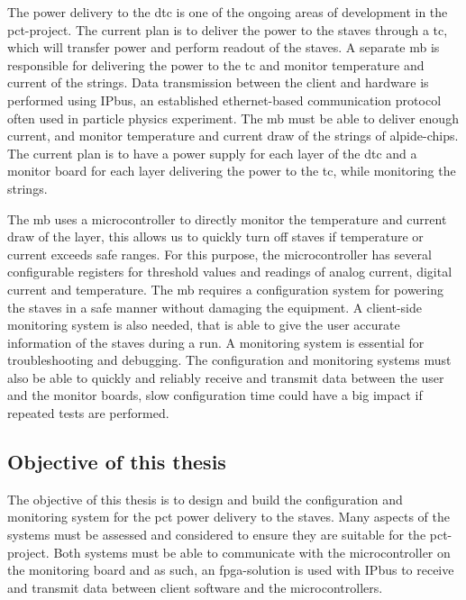 \documentclass[main.tex]{subfiles}
\begin{document}
The power delivery to the \gls{dtc} is one of the ongoing areas of development in the \gls{pct}-project. The current plan is to deliver the power to the staves through a \gls{tc}, which will transfer power and perform readout of the staves. A separate \gls{mb} is responsible for delivering the power to the \gls{tc} and monitor temperature and current of the strings. Data transmission between the client and hardware is performed using IPbus, an established ethernet-based communication protocol often used in particle physics experiment. The \gls{mb} must be able to deliver enough current, and monitor temperature and current draw of the strings of \gls{alpide}-chips. The current plan is to have a power supply for each layer of the \gls{dtc} and a monitor board for each layer delivering the power to the \gls{tc}, while monitoring the strings. \par

The \gls{mb} uses a microcontroller to directly monitor the temperature and current draw of the layer, this allows us to quickly turn off staves if temperature or current exceeds safe ranges. For this purpose, the microcontroller has several configurable registers for threshold values and readings of analog current, digital current and temperature. The \gls{mb} requires a configuration system for powering the staves in a safe manner without damaging the equipment. A client-side monitoring system is also needed, that is able to give the user accurate information of the staves during a run. A monitoring system is essential for troubleshooting and debugging. The configuration and monitoring systems must also be able to quickly and reliably receive and transmit data between the user and the monitor boards, slow configuration time could have a big impact if repeated tests are performed.

\subsection{Objective of this thesis}

The objective of this thesis is to design and build the configuration and monitoring system for the \gls{pct} power delivery to the staves. Many aspects of the systems must be assessed and considered to ensure they are suitable for the \gls{pct}-project. Both systems must be able to communicate with the microcontroller on the monitoring board and as such, an \acrshort{fpga}-solution is used with IPbus to receive and transmit data between client software and the microcontrollers. 
\end{document}

